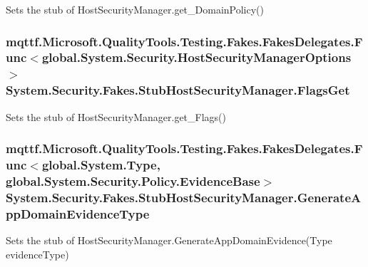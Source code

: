 Sets the stub of Host\-Security\-Manager.\-get\-\_\-\-Domain\-Policy()

\hypertarget{class_system_1_1_security_1_1_fakes_1_1_stub_host_security_manager_ae95a91bb97c0449204c601b9447e7e72}{
\subsubsection[{Flags\-Get}]{\setlength{\rightskip}{0pt plus 5cm}mqttf.\-Microsoft.\-Quality\-Tools.\-Testing.\-Fakes.\-Fakes\-Delegates.\-Func$<$global.\-System.\-Security.\-Host\-Security\-Manager\-Options$>$ System.\-Security.\-Fakes.\-Stub\-Host\-Security\-Manager.\-Flags\-Get}}\label{class_system_1_1_security_1_1_fakes_1_1_stub_host_security_manager_ae95a91bb97c0449204c601b9447e7e72}


Sets the stub of Host\-Security\-Manager.\-get\-\_\-\-Flags()

\hypertarget{class_system_1_1_security_1_1_fakes_1_1_stub_host_security_manager_a4e2e0b2835efa9fdf61ba91af1927a30}{
\subsubsection[{Generate\-App\-Domain\-Evidence\-Type}]{\setlength{\rightskip}{0pt plus 5cm}mqttf.\-Microsoft.\-Quality\-Tools.\-Testing.\-Fakes.\-Fakes\-Delegates.\-Func$<$global.\-System.\-Type, global.\-System.\-Security.\-Policy.\-Evidence\-Base$>$ System.\-Security.\-Fakes.\-Stub\-Host\-Security\-Manager.\-Generate\-App\-Domain\-Evidence\-Type}}\label{class_system_1_1_security_1_1_fakes_1_1_stub_host_security_manager_a4e2e0b2835efa9fdf61ba91af1927a30}


Sets the stub of Host\-Security\-Manager.\-Generate\-App\-Domain\-Evidence(\-Type evidence\-Type)

